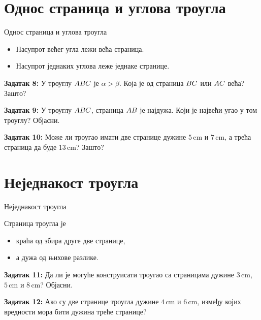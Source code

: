 \documentclass[12pt]{beamer}
\begin{document}
\section{Однос страница и углова троугла}
\begin{frame}{Однос страница и углова троугла}

\begin{itemize}
    \item Насупрот већег угла лежи већа страница.
    \item Насупрот једнаких углова леже једнаке странице.
\end{itemize}

\textbf{Задатак 8:}
У троуглу $\mathnormal{ABC}$ је $\alpha > \beta$.
Која је од страница
$\mathnormal{BC}$ или $\mathnormal{AC}$ већа? Зашто?

\textbf{Задатак 9:}
У троуглу $\mathnormal{ABC}$, страница $\mathnormal{AB}$ је најдужа.
Који је највећи угао у том троуглу? Објасни.

\textbf{Задатак 10:}
Може ли троугао имати две странице дужине
$5 \,\mathrm{cm}$ и $7 \,\mathrm{cm}$,
а трећа страница да буде $13 \,\mathrm{cm}$? Зашто?

\end{frame}


\section{Неједнакост троугла}
\begin{frame}{Неједнакост троугла}

Страница троугла је
\begin{itemize}
    \item краћа од збира друге две странице,
    \item а дужа од њихове разлике.
\end{itemize}

\textbf{Задатак 11:}
Да ли је могуће конструисати троугао са страницама дужине
$3 \,\mathrm{cm}$, $5 \,\mathrm{cm}$ и $8 \,\mathrm{cm}$? Објасни.

\textbf{Задатак 12:}
Ако су две странице троугла дужине
$4 \,\mathrm{cm}$ и $6 \,\mathrm{cm}$,
између којих вредности мора бити дужина треће странице?

\end{frame}
\end{document}
